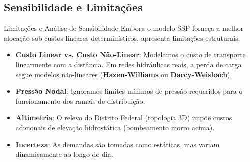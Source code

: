 \subsection{Sensibilidade e Limitações}
\begin{frame}[shrink=5]{Limitações e Análise de Sensibilidade}
  Embora o modelo SSP forneça a melhor alocação sob custos lineares determinísticos, apresenta limitações estruturais:
  
  \begin{itemize}
    \item \textbf{Custo Linear vs. Custo Não-Linear}: Modelamos o custo de transporte linearmente com a distância. Em redes hidráulicas reais, a perda de carga segue modelos não-lineares (\textbf{Hazen-Williams} ou \textbf{Darcy-Weisbach}).
    \item \textbf{Pressão Nodal}: Ignoramos limites mínimos de pressão requeridos para o funcionamento dos ramais de distribuição.
    \item \textbf{Altimetria}: O relevo do Distrito Federal (topologia 3D) impõe custos adicionais de elevação hidrostática (bombeamento morro acima).
    \item \textbf{Incerteza}: As demandas são tomadas como estáticas, mas variam dinamicamente ao longo do dia.
  \end{itemize}
\end{frame}
